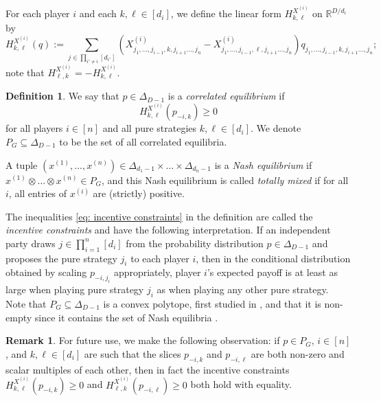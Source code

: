 \documentclass[11pt]{amsart}
\theoremstyle{definition}
\newtheorem{remark}[theorem]{Remark}
\newtheorem{definition}[theorem]{Definition}
\numberwithin{subcase}{case}
\newcommand{\RR}{{\mathbb R}}
\begin{document}
For each player $i$ and each $k,\ell \in [d_i]$, we define the linear
form $H^{X^{(i)}}_{k,\ell}$ on $\RR^{D/d_i}$ by
\[H^{X^{(i)}}_{k,\ell}(q):=\sum_{j \in \prod_{i' \neq i}
[d_{i'}]} \left(X^{(i)}_{j_1,\dots, j_{i-1},k,j_{i+1} \dots,
j_n}-X^{(i)}_{j_1,\dots, j_{i-1},\ell,j_{i+1} \dots, j_n}   \right)
q_{j_1,\dots, j_{i-1},k,j_{i+1} \dots, j_n};   \] 
note that $H^{X^{(i)}}_{\ell,k}=-H^{X^{(i)}}_{k,\ell}$. 



\begin{definition} \label{de:CorrEq}
We say that $p \in \Delta_{D -1}$ is a \textit{correlated equilibrium} if 
\begin{equation} H^{X^{(i)}}_{k,\ell}(p_{-i,k}) \geq 0 \label{eq: incentive constraints}\end{equation}
for all players $i \in [n]$ and all pure strategies $k, \ell \in [d_i]$. We denote $P_G \subseteq \Delta_{D-1}$ to be the set of all correlated equilibria.

A tuple $(x^{(1)}, \dots, x^{(n)}) \in \Delta_{d_1-1} \times \dots \times
\Delta_{d_n-1}$ is a \textit{Nash equilibrium} if $x^{(1)} \otimes \dots
\otimes x^{(n)} \in P_G$, and this Nash equilibrium is called {\em totally
mixed} if for all $i$, all entries of $x^{(i)}$ are (strictly)
positive. \end{definition}

The inequalities \eqref{eq: incentive constraints} in the definition are called the {\em incentive constraints} and
have the following interpretation. If an independent party draws $j \in
\prod_{i=1}^n [d_i]$ from the probability distribution $p\in\Delta_{D-1}$ and proposes
the pure strategy $j_i$ to each player $i$, then in the conditional
distribution obtained by scaling $p_{-i,j_i}$ appropriately, player $i$'s
expected payoff is at least as large when playing pure strategy $j_i$ as when playing any other pure strategy. Note that $P_G \subseteq \Delta_{D-1}$ is a convex
polytope, first studied in \cite[Section 4g]{Aumann87}, and that it is non-empty since it contains the set of Nash equilibria \cite{nash1950equilibrium}.

\begin{remark} \label{re:IncConsEq}
For future use, we make the following observation: if $p \in P_G$, $i \in
[n]$, and $k,\ell \in [d_i]$ are such that the slices $p_{-i,k}$ and $p_{-i,\ell}$
are both non-zero and scalar multiples of each other, then in fact the
incentive constraints $H^{X^{(i)}}_{k,\ell}(p_{-i,k}) \geq 0$ and
$H^{X^{(i)}}_{\ell,k}(p_{-i,\ell}) \geq 0$ both hold with equality.
\end{remark}
\end{document}
